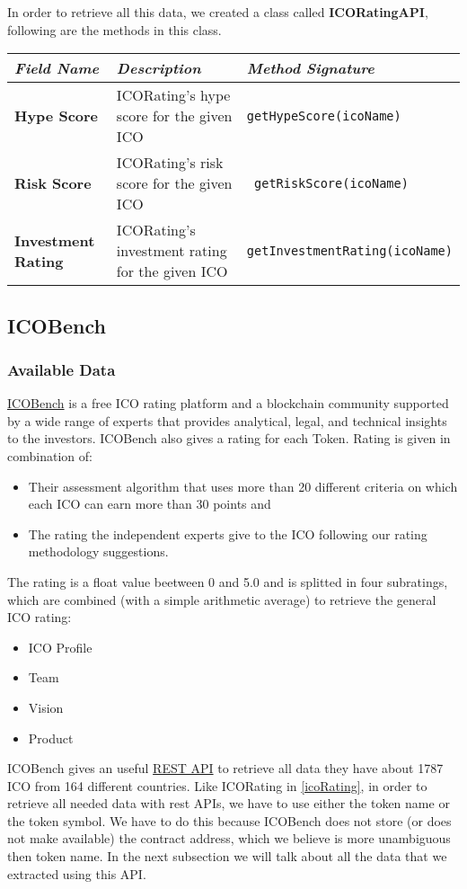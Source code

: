 In order to retrieve all this data, we created a class called \textbf{ICORatingAPI}, following are the methods in this class.
\begin{center}
\begin{tabular}{| C{2.5cm} | C{4cm} | C{5.5cm} |} \hline
    \textit{Field Name} & \textit{Description} & \textit{Method Signature}\\ \hline 
    \textbf{Hype Score} & ICORating's hype score for the given ICO & \texttt{getHypeScore(icoName)}\\ \hline 
    \textbf{Risk Score} & ICORating's risk score for the given ICO & \texttt{ getRiskScore(icoName)}\\ \hline 
    \textbf{Investment Rating} & ICORating's investment rating for the given ICO & \texttt{getInvestmentRating(icoName)}\\ \hline 
\end{tabular}
\end{center}

\subsection{ICOBench}
\label{icoBench}
\subsubsection{Available Data}
\href{https://icobench.com/}{ICOBench} is a free ICO rating platform and a blockchain community supported by a wide range of experts that provides analytical, legal, and technical insights to the investors.
ICOBench also gives a rating for each Token. Rating is given in combination of:
\begin{itemize}
    \item Their assessment algorithm that uses more than 20 different criteria on which each ICO can earn more than 30 points and
    \item The rating the independent experts give to the ICO following our rating methodology suggestions.
\end{itemize} 

The rating is a float value beetween 0 and 5.0 and is splitted in four subratings, which are combined (with a simple arithmetic average) to retrieve the general ICO rating:
\begin{itemize}
    \item ICO Profile
    \item Team
    \item Vision
    \item Product
\end{itemize}
ICOBench gives an useful \href{https://icobench.com/developers}{REST API} to retrieve all data they have about 1787 ICO from 164 different countries. \newline
Like ICORating in \ref{icoRating}, in order to retrieve all needed data with rest APIs, we have to use  either the token name or the token symbol. We have to do this because ICOBench does not store (or does not make available) the contract address, which we believe is more unambiguous then token name. \newline
In the next subsection we will talk about all the data that we extracted using this API.
